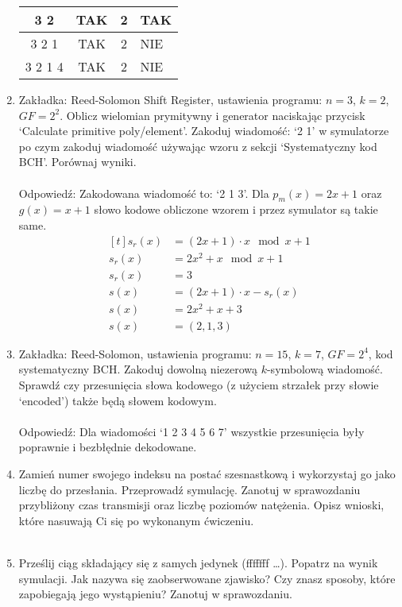 \begin{enumerate}
\begin{table}[H]
\begin{tabular}{|c|c|c|>{\centering\arraybackslash}p{5cm}|}
            3 2 & TAK & 2 & TAK \\
            \hline
            3 2 1 & TAK & 2 & NIE \\
            \hline
            3 2 1 4 & TAK & 2 & NIE \\
            \hline
        \end{tabular}
    \end{table}
    \item Zakładka: Reed-Solomon Shift Register, ustawienia programu:
    $n = 3$, $k = 2$, $GF = 2^2$. Oblicz wielomian prymitywny i generator naciskając
    przycisk `Calculate primitive poly/element'.
    Zakoduj wiadomość: `2 1' w symulatorze po czym zakoduj wiadomość
    używając wzoru z sekcji `Systematyczny kod BCH'. Porównaj wyniki.
    \\ \\
    Odpowiedź: Zakodowana wiadomość to: `2 1 3'. Dla $p_m(x) = 2x + 1$ oraz $g(x) = x + 1$ słowo kodowe
    obliczone wzorem i przez symulator są takie same.
    \begin{equation*}
        \begin{aligned}[t]
            s_r(x) &= (2x+1) \cdot x \mod x + 1 \\
            s_r(x) &= 2x^2 + x \mod x + 1 \\
            s_r(x) &= 3 \\
            s(x) &= (2x+1) \cdot x - s_r(x) \\
            s(x) &= 2x^2 + x + 3 \\
            s(x) &= (2,1,3)
        \end{aligned}
    \end{equation*}
    \item Zakładka: Reed-Solomon, ustawienia programu: $n = 15$, $k=7$, $GF = 2^4$,
    kod systematyczny BCH.
    Zakoduj dowolną niezerową $k$-symbolową wiadomość. Sprawdź czy przesunięcia słowa kodowego
    (z użyciem strzałek przy słowie `encoded') także będą słowem kodowym. \\ \\
    Odpowiedź: Dla wiadomości `1 2 3 4 5 6 7' wszystkie przesunięcia były poprawnie i bezbłędnie dekodowane.
    \item Zamień numer swojego indeksu na postać szesnastkową i wykorzystaj go jako liczbę do przesłania. Przeprowadź symulację. Zanotuj w sprawozdaniu
    przybliżony czas transmisji oraz liczbę poziomów natężenia. Opisz wnioski, które nasuwają Ci się po wykonanym ćwiczeniu. \\ \\
    \item Prześlij ciąg składający się z samych jedynek (fffffff \dots). Popatrz na wynik symulacji. Jak nazywa się zaobserwowane zjawisko? Czy znasz sposoby,
    które zapobiegają jego wystąpieniu? Zanotuj w sprawozdaniu.
\end{enumerate}
